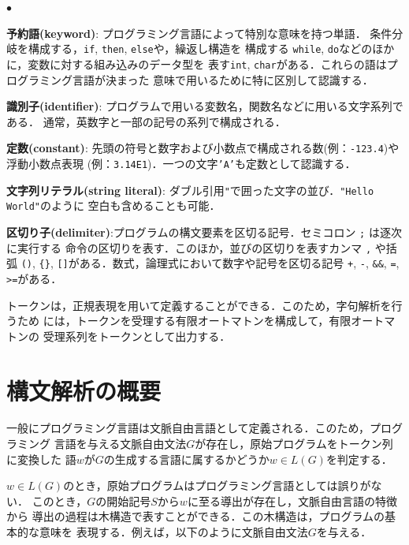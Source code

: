 \documentclass[a4j,dvipdfmx]{jbook}
\begin{document}
\begin{list}{$\bullet$}{\setlength{\leftmargin}{10pt}}
  \item {\bf 予約語(keyword)}: プログラミング言語によって特別な意味を持つ単語．
  条件分岐を構成する，\texttt{if}, \texttt{then}, \texttt{else}や，繰返し構造を
  構成する \texttt{while}, \texttt{do}などのほかに，変数に対する組み込みのデータ型を
  表す\texttt{int}, \texttt{char}がある．これらの語はプログラミング言語が決まった
  意味で用いるために特に区別して認識する．
  \item {\bf 識別子(identifier)}: プログラムで用いる変数名，関数名などに用いる文字系列である．
  通常，英数字と一部の記号の系列で構成される．
  \item {\bf 定数(constant)}: 先頭の符号と数字および小数点で構成される数(例：\texttt{-123.4})や浮動小数点表現
  (例：\texttt{3.14E1})．一つの文字\texttt{'A'}も定数として認識する． 
  \item {\bf 文字列リテラル(string literal)}: ダブル引用\texttt{"}で囲った文字の並び．\texttt{"Hello World"}のように
  空白も含めることも可能．
  \item {\bf 区切り子(delimiter)}:プログラムの構文要素を区切る記号．セミコロン \texttt{;} は逐次に実行する
  命令の区切りを表す．このほか，並びの区切りを表すカンマ \texttt{,} や括弧 \texttt{()},
  \texttt{\{\}}, \texttt{[]}がある．数式，論理式において数字や記号を区切る記号 
  \texttt{+}, \texttt{-}, \texttt{\&\&}, \texttt{=}, \texttt{>=}がある．
\end{list}

トークンは，正規表現を用いて定義することができる．このため，字句解析を行うため
には，トークンを受理する有限オートマトンを構成して，有限オートマトンの
受理系列をトークンとして出力する．

\section{構文解析の概要}

一般にプログラミング言語は文脈自由言語として定義される．このため，プログラミング
言語を与える文脈自由文法$G$が存在し，原始プログラムをトークン列に変換した
語$w$が$G$の生成する言語に属するかどうか$w\in L(G)$を判定する．

$w\in L(G)$のとき，原始プログラムはプログラミング言語としては誤りがない．
このとき，$G$の開始記号$S$から$w$に至る導出が存在し，文脈自由言語の特徴から
導出の過程は木構造で表すことができる．この木構造は，プログラムの基本的な意味を
表現する．例えば，以下のように文脈自由文法$G$を与える．
\end{document}
